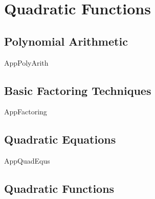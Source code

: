 \begin{comment}
\chapter{Absolute Value Functions}

\section{Absolute Value Equations}

{AppAbsValEqIneq}

\newpage

\section{Absolute Value Functions}



\newpage
\end{comment}

\chapter{Quadratic Functions}

\section{Polynomial Arithmetic}

{AppPolyArith}

\newpage

\section{Basic Factoring Techniques}

{AppFactoring}

\newpage

\section{Quadratic Equations}

{AppQuadEqus}

\newpage

\section{Quadratic Functions}


\newpage

